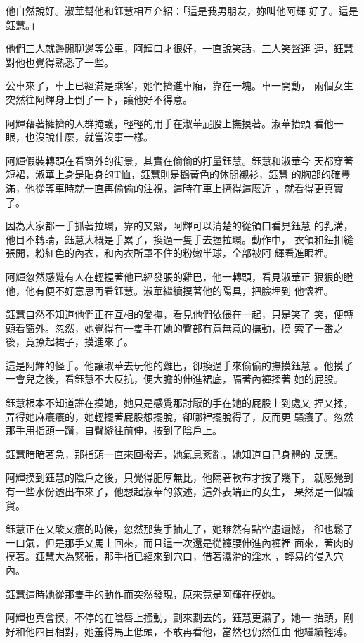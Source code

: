 他自然說好。淑華幫他和鈺慧相互介紹：「這是我男朋友，妳叫他阿輝
好了。這是鈺慧。」

他們三人就邊閒聊邊等公車，阿輝口才很好，一直說笑話，三人笑聲連
連，鈺慧對他也覺得熟悉了一些。

公車來了，車上已經滿是乘客，她們擠進車廂，靠在一塊。車一開動，
兩個女生突然往阿輝身上倒了一下，讓他好不得意。

阿輝藉著擁擠的人群掩護，輕輕的用手在淑華屁股上撫摸著。淑華抬頭
看他一眼，也沒說什麼，就當沒事一樣。

阿輝假裝轉頭在看窗外的街景，其實在偷偷的打量鈺慧。鈺慧和淑華今
天都穿著短裙，淑華上身是貼身的T恤，鈺慧則是鵝黃色的休閒襯衫，鈺慧
的胸部的確豐滿，他從等車時就一直再偷偷的注視，這時在車上擠得這麼近
，就看得更真實了。

因為大家都一手抓著拉環，靠的又緊，阿輝可以清楚的從領口看見鈺慧
的乳溝，他目不轉睛，鈺慧大概是手累了，換過一隻手去握拉環。動作中，
衣領和鈕扣縫張開，粉紅色的內衣，和內衣所罩不住的粉嫩半球，全部被阿
輝看進眼裡。

阿輝忽然感覺有人在輕握著他已經發脹的雞巴，他一轉頭，看見淑華正
狠狠的瞪他，他有便不好意思再看鈺慧。淑華繼續摸著他的陽具，把臉埋到
他懷裡。

鈺慧自然不知道他們正在互相的愛撫，看見他們依偎在一起，只是笑了
笑，便轉頭看窗外。忽然，她覺得有一隻手在她的臀部有意無意的撫動，摸
索了一番之後，竟撩起裙子，摸進來了。

這是阿輝的怪手。他讓淑華去玩他的雞巴，卻換過手來偷偷的撫摸鈺慧
。他摸了一會兒之後，看鈺慧不大反抗，便大膽的伸進裙底，隔著內褲揉著
她的屁股。

鈺慧根本不知道誰在摸她，她只是感覺那討厭的手在她的屁股上到處又
捏又揉，弄得她麻癢癢的，她輕擺著屁股想擺脫，卻哪裡擺脫得了，反而更
騷癢了。忽然那手用指頭一躦，自臀縫往前伸，按到了陰戶上。

鈺慧暗暗著急，那指頭一直來回撥弄，她氣息紊亂，她知道自己身體的
反應。

阿輝摸到鈺慧的陰戶之後，只覺得肥厚無比，他隔著軟布才按了幾下，
就感覺到有一些水份透出布來了，他想起淑華的敘述，這外表端正的女生，
果然是一個騷貨。

鈺慧正在又酸又癢的時候，忽然那隻手抽走了，她雖然有點空虛遺憾，
卻也鬆了一口氣，但是那手又馬上回來，而且這一次還是從褲腰伸進內褲裡
面來，著肉的摸著。鈺慧大為緊張，那手指已經來到穴口，借著濕滑的淫水
，輕易的侵入穴內。

鈺慧這時她從那隻手的動作而突然發現，原來竟是阿輝在摸她。

阿輝也真會摸，不停的在陰唇上搔動，劃來劃去的，鈺慧更濕了，她一
抬頭，剛好和他四目相對，她羞得馬上低頭，不敢再看他，當然也仍然任由
他繼續輕薄。

